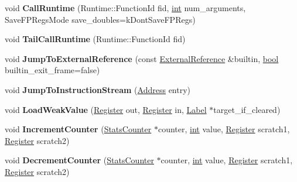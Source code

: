 \begin{DoxyCompactItemize}
void {\bfseries Call\+Runtime} (Runtime\+::\+Function\+Id fid, \mbox{\hyperlink{classint}{int}} num\+\_\+arguments, Save\+F\+P\+Regs\+Mode save\+\_\+doubles=k\+Dont\+Save\+F\+P\+Regs)
\item 
\mbox{\label{classv8_1_1internal_1_1MacroAssembler_aefb569829758555a7394ce1d34ed2bef}} 
void {\bfseries Tail\+Call\+Runtime} (Runtime\+::\+Function\+Id fid)
\item 
\mbox{\label{classv8_1_1internal_1_1MacroAssembler_a83aa1bd635235afda8a1e96390da9227}} 
void {\bfseries Jump\+To\+External\+Reference} (const \mbox{\hyperlink{classv8_1_1internal_1_1ExternalReference}{External\+Reference}} \&builtin, \mbox{\hyperlink{classbool}{bool}} builtin\+\_\+exit\+\_\+frame=false)
\item 
\mbox{\label{classv8_1_1internal_1_1MacroAssembler_a18fc118dd1ecc3b59755acce49880671}} 
void {\bfseries Jump\+To\+Instruction\+Stream} (\mbox{\hyperlink{classuintptr__t}{Address}} entry)
\item 
\mbox{\label{classv8_1_1internal_1_1MacroAssembler_ab142a904bdb8e7d16e762655774c5284}} 
void {\bfseries Load\+Weak\+Value} (\mbox{\hyperlink{classv8_1_1internal_1_1Register}{Register}} out, \mbox{\hyperlink{classv8_1_1internal_1_1Register}{Register}} in, \mbox{\hyperlink{classv8_1_1internal_1_1Label}{Label}} $\ast$target\+\_\+if\+\_\+cleared)
\item 
\mbox{\label{classv8_1_1internal_1_1MacroAssembler_a7a18bd522429bd7c7f20cd2a4325249d}} 
void {\bfseries Increment\+Counter} (\mbox{\hyperlink{classv8_1_1internal_1_1StatsCounter}{Stats\+Counter}} $\ast$counter, \mbox{\hyperlink{classint}{int}} value, \mbox{\hyperlink{classv8_1_1internal_1_1Register}{Register}} scratch1, \mbox{\hyperlink{classv8_1_1internal_1_1Register}{Register}} scratch2)
\item 
\mbox{\label{classv8_1_1internal_1_1MacroAssembler_a989b426fe1ff4cb41c77b21f849fb370}} 
void {\bfseries Decrement\+Counter} (\mbox{\hyperlink{classv8_1_1internal_1_1StatsCounter}{Stats\+Counter}} $\ast$counter, \mbox{\hyperlink{classint}{int}} value, \mbox{\hyperlink{classv8_1_1internal_1_1Register}{Register}} scratch1, \mbox{\hyperlink{classv8_1_1internal_1_1Register}{Register}} scratch2)

\end{DoxyCompactItemize}
